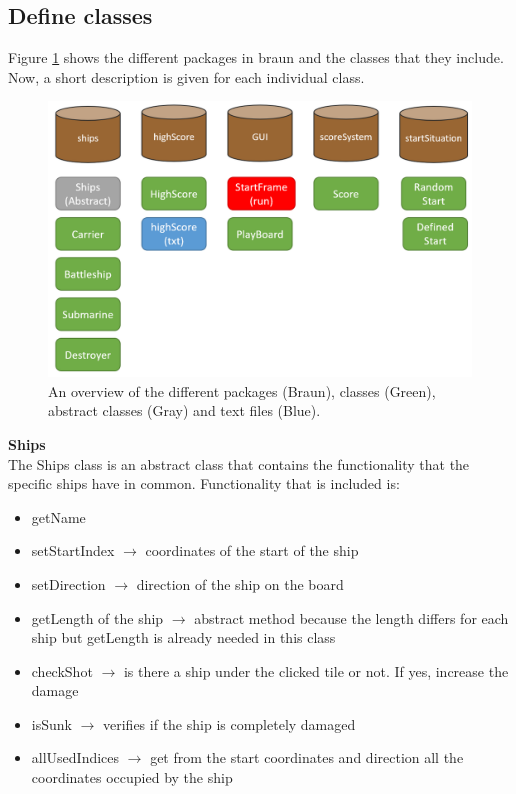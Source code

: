 \documentclass[a4paper,10pt]{article}
\begin{document}
\subsection{Define classes}
Figure \ref{f:differentClasses} shows the different packages in braun and the classes that they include. Now, a short description is given for each individual class.

\begin{figure}[h!]
	\begin{center}
		\includegraphics[width=1.0\linewidth]{overviewClasses.PNG}
	\end{center}	
	\caption{An overview of the different packages (Braun), classes (Green), abstract classes (Gray) and text files (Blue).}
	\label{f:differentClasses}
\end{figure}

\newpage

\textbf{Ships}\\
The Ships class is an abstract class that contains the functionality that the specific ships have in common. Functionality that is included is: 
\begin{itemize}
	\item getName 
	\item setStartIndex $ \rightarrow $ coordinates of the start of the ship
	\item setDirection $ \rightarrow $ direction of the ship on the board
	\item getLength of the ship $ \rightarrow $ abstract method because the length differs for each ship but getLength is already needed in this class
	\item checkShot $ \rightarrow $ is there a ship under the clicked tile or not. If yes, increase the damage
	\item isSunk $ \rightarrow $ verifies if the ship is completely damaged
	\item allUsedIndices $ \rightarrow $ get from the start coordinates and direction all the coordinates occupied by the ship
\end{itemize}
\end{document}

